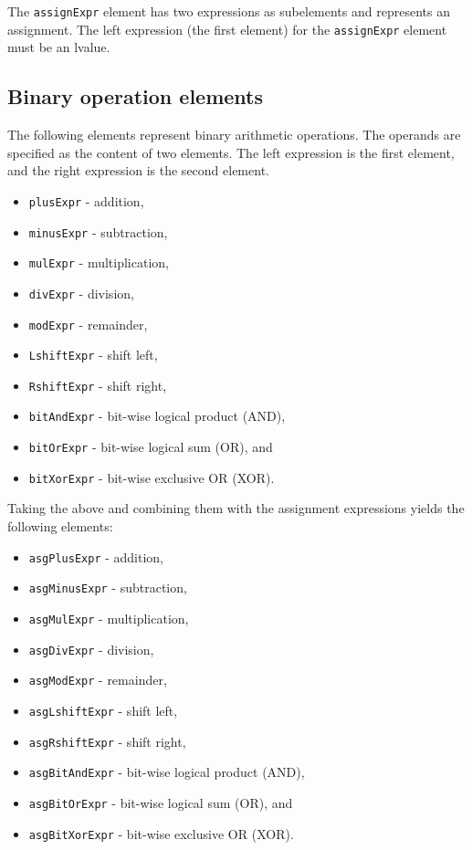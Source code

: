 The {\tt assignExpr} element has two expressions as subelements and represents an assignment. The left expression (the first element) for the {\tt assignExpr} element must be an lvalue.


\subsection{Binary operation elements}

The following elements represent binary arithmetic operations. The operands are specified as the content of two elements. The left expression is the first element, and the right expression is the second element.

\begin{itemize}
\item {\tt plusExpr} - addition,
\item {\tt minusExpr} - subtraction,
\item {\tt mulExpr} - multiplication,
\item {\tt divExpr} - division,
\item {\tt modExpr} - remainder,
\item {\tt LshiftExpr} - shift left,
\item {\tt RshiftExpr} - shift right,
\item {\tt bitAndExpr} - bit-wise logical product (AND),
\item {\tt bitOrExpr} - bit-wise logical sum (OR), and
\item {\tt bitXorExpr} - bit-wise exclusive OR (XOR).
\end{itemize}

Taking the above and combining them with the assignment expressions yields the following elements:

\begin{itemize}
\item {\tt asgPlusExpr} - addition,
\item {\tt asgMinusExpr} - subtraction,
\item {\tt asgMulExpr} - multiplication,
\item {\tt asgDivExpr} - division,
\item {\tt asgModExpr} - remainder,
\item {\tt asgLshiftExpr} - shift left,
\item {\tt asgRshiftExpr} - shift right,
\item {\tt asgBitAndExpr} - bit-wise logical product (AND),
\item {\tt asgBitOrExpr} - bit-wise logical sum (OR), and
\item {\tt asgBitXorExpr} - bit-wise exclusive OR (XOR).
\end{itemize}

